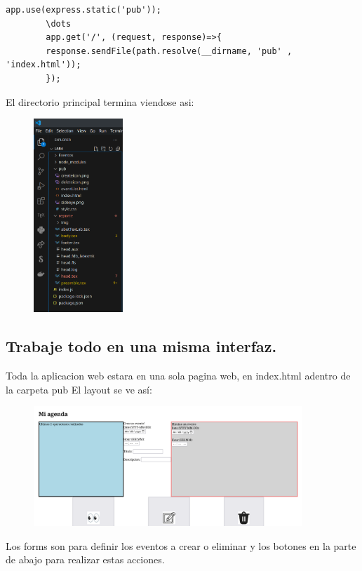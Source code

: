 	\begin{lstlisting}[style=js]
		app.use(express.static('pub'));
		\dots
		app.get('/', (request, response)=>{
    	response.sendFile(path.resolve(__dirname, 'pub' , 'index.html'));
		});
	\end{lstlisting}

	El directorio principal termina viendose asi:

	\begin{figure}[h]
		\centering
		\includegraphics[width=0.3\textwidth]{./img/1.png} %
	\end{figure}


	\subsection{Trabaje todo en una misma interfaz.}

	Toda la aplicacion web estara en una sola pagina web, en index.html adentro de la carpeta pub
	El layout se ve así: 
	\pagebreak
	\begin{figure}[h]
		\centering
		\includegraphics[width=0.9\textwidth]{./img/2.png} %
	\end{figure}
	\newline
	Los forms son para definir los eventos a crear o eliminar y los botones en la parte de abajo para realizar estas acciones.\newline \newline

